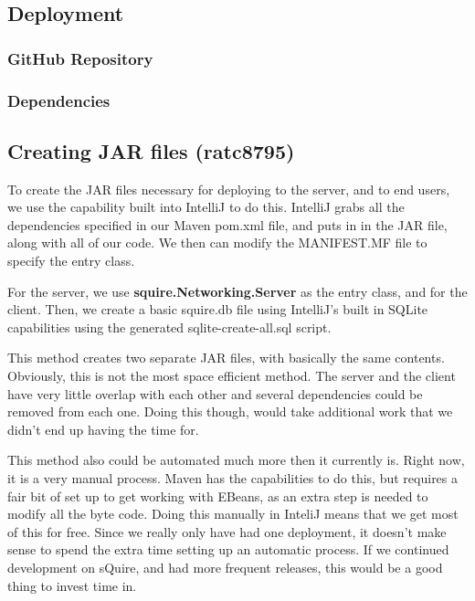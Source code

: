 \documentclass[twoside,letterpaper]{article}
\begin{document}
\newpage
\subsection{Deployment}

\subsubsection{GitHub Repository}



\newpage
\subsubsection{Dependencies}

\newpage
\subsection{Creating JAR files (ratc8795)}

To create the JAR files necessary for deploying to the server, and to end users, we use the capability built into IntelliJ to do this. IntelliJ grabs all the dependencies specified in our Maven pom.xml file, and puts in in the JAR file, along with all of our code. We then can modify the MANIFEST.MF file to specify the entry class.

For the server, we use \textbf{squire.Networking.Server} as the entry class, and  for the client. Then, we create a basic squire.db file using IntelliJ's built in SQLite capabilities using the generated sqlite-create-all.sql script.

This method creates two separate JAR files, with basically the same contents. Obviously, this is not the most space efficient method. The server and the client have very little overlap with each other and several dependencies could be removed from each one. Doing this though, would take additional work that we didn't end up having the time for.

This method also could be automated much more then it currently is. Right now, it is a very manual process. Maven has the capabilities to do this, but requires a fair bit of set up to get working with EBeans, as an extra step is needed to modify all the byte code. Doing this manually in InteliJ means that we get most of this for free. Since we really only have had one deployment, it doesn't make sense to spend the extra time setting up an automatic process. If we continued development on sQuire, and had more frequent releases, this would be a good thing to invest time in.
\end{document}
